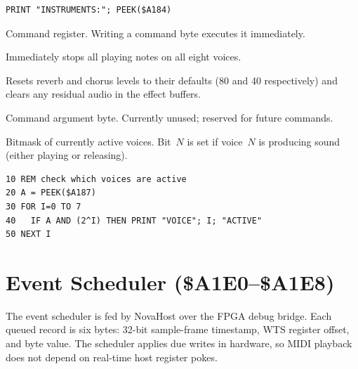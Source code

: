 \begin{lstlisting}
PRINT "INSTRUMENTS:"; PEEK($A184)
\end{lstlisting}



Command register.  Writing a command byte executes it immediately.


Immediately stops all playing notes on all eight voices.


Resets reverb and chorus levels to their defaults (80 and 40 respectively) and
clears any residual audio in the effect buffers.



Command argument byte.  Currently unused; reserved for future commands.



Bitmask of currently active voices.  Bit~$N$ is set if voice~$N$ is producing
sound (either playing or releasing).


\begin{lstlisting}
10 REM check which voices are active
20 A = PEEK($A187)
30 FOR I=0 TO 7
40   IF A AND (2^I) THEN PRINT "VOICE"; I; "ACTIVE"
50 NEXT I
\end{lstlisting}


\section{Event Scheduler (\$A1E0--\$A1E8)}
\label{sec:wts-events}

The event scheduler is fed by NovaHost over the FPGA debug bridge.  Each queued
record is six bytes: 32-bit sample-frame timestamp, WTS register offset, and
byte value.  The scheduler applies due writes in hardware, so MIDI playback does
not depend on real-time host register pokes.

